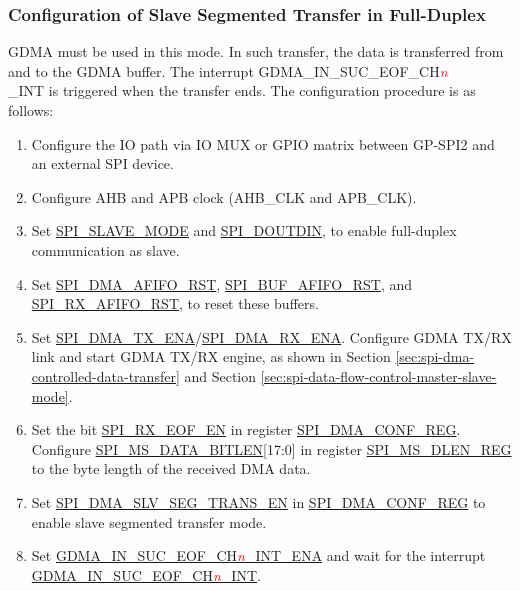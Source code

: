 \documentclass[main\_\_EN.tex]{subfiles}
\begin{document}
\subsubsection{Configuration of Slave Segmented Transfer in Full-Duplex}\label{para:spi-slave-fd-seg-trans}
GDMA must be used in this mode. In such transfer, the data is transferred from and to the GDMA buffer. The interrupt GDMA\_IN\_SUC\_EOF\_CH\textcolor{red}{\it{n}}\\\_INT is triggered when the transfer ends. The configuration procedure is as follows:

\begin{enumerate}
   \item Configure the IO path via IO MUX or GPIO matrix between GP-SPI2 and an external SPI device.
   \item Configure AHB and APB clock (AHB\_CLK and APB\_CLK).

    \item Set \hyperref[fielddesc:SPISLAVEMODE]{SPI\_SLAVE\_MODE} and \hyperref[fielddesc:SPIDOUTDIN]{SPI\_DOUTDIN}, to enable full-duplex communication as slave.

    \item Set \hyperref[fielddesc:SPIDMAAFIFORST]{SPI\_DMA\_AFIFO\_RST}, \hyperref[fielddesc:SPIBUFAFIFORST]{SPI\_BUF\_AFIFO\_RST}, and \hyperref[fielddesc:SPIRXAFIFORST]{SPI\_RX\_AFIFO\_RST}, to reset these buffers.

    \item Set \hyperref[fielddesc:SPIDMATXENA]{SPI\_DMA\_TX\_ENA}/\hyperref[fielddesc:SPIDMARXENA]{SPI\_DMA\_RX\_ENA}. Configure GDMA TX/RX link and start GDMA TX/RX engine, as shown in Section \ref{sec:spi-dma-controlled-data-transfer} and Section \ref{sec:spi-data-flow-control-master-slave-mode}.

    \item Set the bit \hyperref[fielddesc:SPIRXEOFEN]{SPI\_RX\_EOF\_EN} in register \hyperref[regdesc:SPIDMACONFREG]{SPI\_DMA\_CONF\_REG}. Configure \hyperref[fielddesc:SPIMSDATABITLEN]{SPI\_MS\_DATA\_BITLEN}[17:0] in register \hyperref[regdesc:SPIMSDLENREG]{SPI\_MS\_DLEN\_REG} to the byte length of the received DMA data.

    \item Set \hyperref[fielddesc:SPIDMASLVSEGTRANSEN]{SPI\_DMA\_SLV\_SEG\_TRANS\_EN} in \hyperref[regdesc:SPIDMACONFREG]{SPI\_DMA\_CONF\_REG} to enable slave segmented transfer mode.

    \item Set \hyperref[fielddesc:GDMAINSUCEOFCHNINTENA]{GDMA\_IN\_SUC\_EOF\_CH\textcolor{red}{\it{n}}\_INT\_ENA} and wait for the interrupt \hyperref[int:GDMAINSUCEOFINT]{GDMA\_IN\_SUC\_EOF\_CH\textcolor{red}{\it{n}}\_INT}.
\end{enumerate}
\end{document}
